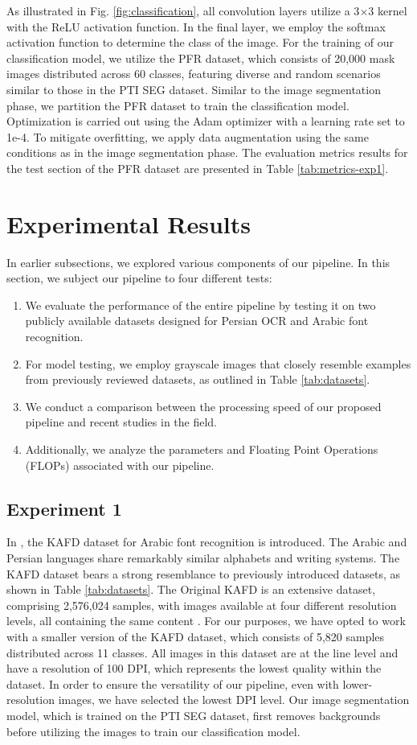 \documentclass[conference]{IEEEtran}
\begin{document}
As illustrated in Fig. \ref{fig:classification}, all convolution layers utilize a 3$\times$3 kernel with the ReLU activation function. In the final layer, we employ the softmax activation function to determine the class of the image.
For the training of our classification model, we utilize the PFR dataset, which consists of 20,000 mask images distributed across 60 classes, featuring diverse and random scenarios similar to those in the PTI SEG dataset. Similar to the image segmentation phase, we partition the PFR dataset to train the classification model. Optimization is carried out using the Adam optimizer with a learning rate set to 1e-4. To mitigate overfitting, we apply data augmentation using the same conditions as in the image segmentation phase.
The evaluation metrics results for the test section of the PFR dataset are presented in Table \ref{tab:metrics-exp1}.  \section{Experimental Results}
\label{section:experiments}
In earlier subsections, we explored various components of our pipeline. In this section, we subject our pipeline to four different tests:
\begin{enumerate}
\item We evaluate the performance of the entire pipeline by testing it on two publicly available datasets designed for Persian OCR and Arabic font recognition.
\item For model testing, we employ grayscale images that closely resemble examples from previously reviewed datasets, as outlined in Table \ref{tab:datasets}.
\item We conduct a comparison between the processing speed of our proposed pipeline and recent studies in the field.
\item Additionally, we analyze the parameters and Floating Point Operations (FLOPs) associated with our pipeline.
\end{enumerate}


\subsection{Experiment 1}
In \cite{20}, the KAFD dataset for Arabic font recognition is introduced. The Arabic and Persian languages share remarkably similar alphabets and writing systems. The KAFD dataset bears a strong resemblance to previously introduced datasets, as shown in Table \ref{tab:datasets}. The Original KAFD is an extensive dataset, comprising 2,576,024 samples, with images available at four different resolution levels, all containing the same content \cite{20}. For our purposes, we have opted to work with a smaller version of the KAFD dataset, which consists of 5,820 samples distributed across 11 classes. All images in this dataset are at the line level and have a resolution of 100 DPI, which represents the lowest quality within the dataset.
In order to ensure the versatility of our pipeline, even with lower-resolution images, we have selected the lowest DPI level. Our image segmentation model, which is trained on the PTI SEG dataset, first removes backgrounds before utilizing the images to train our classification model.
\end{document}
